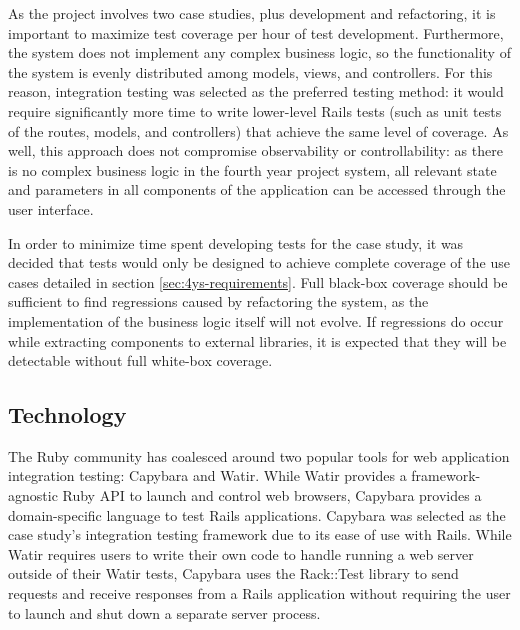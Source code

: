 \documentclass[document.tex]{subfiles}
\begin{document}
As the project involves two case studies, plus development and refactoring,
it is important to maximize test coverage per hour of test development. Furthermore, the system does not implement any complex business logic, so the functionality of the system is evenly distributed among models, views, and controllers. For this reason, integration testing was selected as the preferred testing method: it would require significantly more time to write lower-level Rails tests (such as unit tests of the routes, models, and controllers) that achieve the same level of coverage. As well, this approach does not compromise observability or controllability: as there is no complex business logic in the fourth year project system, all relevant state and parameters in all components of the application can be accessed through the user interface.

In order to minimize time spent developing tests for the case study, it was decided that tests would only be designed to achieve complete coverage of the use cases detailed in section \ref{sec:4ys-requirements}. Full black-box coverage should be sufficient to find regressions caused by refactoring the system, as the implementation of the business logic itself will not evolve. If regressions do occur while extracting components to external libraries, it is expected that they will be detectable without full white-box coverage.



\subsection {Technology}


The Ruby community has coalesced around two popular tools for web application integration testing: Capybara and Watir. While Watir provides a framework-agnostic Ruby API to launch and control web browsers, Capybara provides a domain-specific language to test Rails applications. Capybara was selected as the case study's integration testing framework due to its ease of use with Rails. While Watir requires users to write their own code to handle running a web server outside of their Watir tests, Capybara uses the Rack::Test library to send requests and receive responses from a Rails application without requiring the user to launch and shut down a separate server process.
\end{document}
